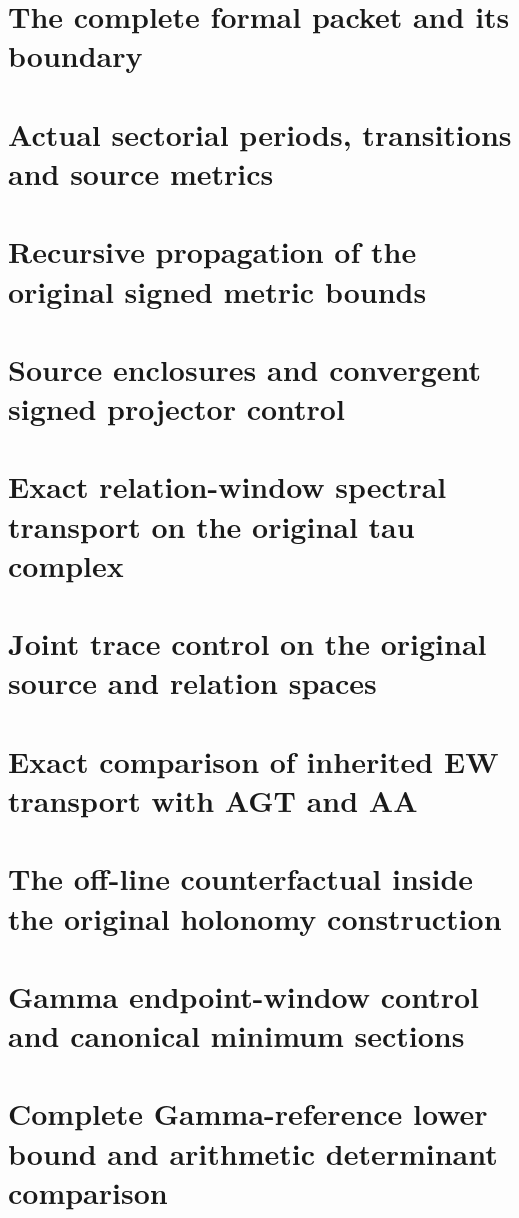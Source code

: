 \documentclass[11pt,a4paper,oneside,openany]{book}
\theoremstyle{definition}
\begin{document}
\chapter{The complete formal packet and its boundary}
\begingroup

\endgroup
\chapter{Actual sectorial periods, transitions and source metrics}
\begingroup

\endgroup
\chapter{Recursive propagation of the original signed metric bounds}
\begingroup

\endgroup
\chapter{Source enclosures and convergent signed projector control}
\begingroup

\endgroup
\chapter{Exact relation-window spectral transport on the original tau complex}
\begingroup

\endgroup
\chapter{Joint trace control on the original source and relation spaces}
\begingroup

\endgroup
\chapter{Exact comparison of inherited EW transport with AGT and AA}
\begingroup

\endgroup
\chapter{The off-line counterfactual inside the original holonomy construction}
\begingroup

\endgroup
\chapter{Gamma endpoint-window control and canonical minimum sections}
\begingroup

\endgroup
\chapter{Complete Gamma-reference lower bound and arithmetic determinant comparison}
\begingroup

\endgroup
\end{document}
